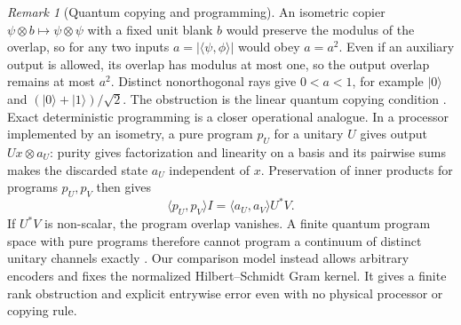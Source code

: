 \documentclass[11pt,reqno]{amsart}
\theoremstyle{definition}
\theoremstyle{remark}
\newtheorem{remark}[theorem]{Remark}
\numberwithin{equation}{section}
\begin{document}
\begin{remark}[Quantum copying and programming]\label{d4:cloning}
An isometric copier \(\psi\otimes b\mapsto\psi\otimes\psi\) with
a fixed unit blank \(b\) would preserve the modulus of the overlap,
so for any two inputs \(a=|\langle\psi,\phi\rangle|\) would obey
\(a=a^2\). Even if an auxiliary output is allowed, its overlap has modulus at most
one, so the output overlap remains at most \(a^2\). Distinct
nonorthogonal rays give \(0<a<1\), for example
\(|0\rangle\) and \((|0\rangle+|1\rangle)/\sqrt2\). The obstruction
is the linear quantum copying condition \cite{d4-wootters,d4-dieks}.
Exact deterministic programming is a closer operational analogue.
In a processor implemented by an isometry, a pure program \(p_U\)
for a unitary \(U\) gives output \(Ux\otimes a_U\): purity gives
factorization and linearity on a basis and its pairwise sums makes
the discarded state \(a_U\) independent of \(x\). Preservation of
inner products for programs \(p_U,p_V\) then gives
\[
 \langle p_U,p_V\rangle I=\langle a_U,a_V\rangle U^*V .
\]
If \(U^*V\) is non-scalar, the program overlap vanishes. A finite
quantum program space with pure programs therefore cannot program a continuum of
distinct unitary channels exactly \cite[pp.~321--322]{d4-program}.
Our comparison model instead allows arbitrary encoders and fixes
the normalized Hilbert--Schmidt Gram kernel. It gives a finite
rank obstruction and explicit entrywise error even with no physical
processor or copying rule.
\end{remark}
\end{document}
